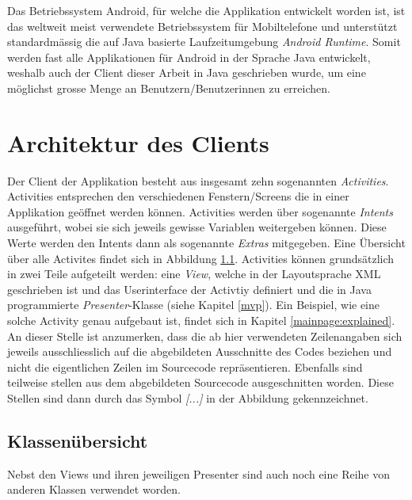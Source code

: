 \documentclass[a4paper,11pt]{report}
\begin{document}
			Das Betriebssystem Android, für welche die Applikation entwickelt worden ist, ist das weltweit meist verwendete Betriebssystem für Mobiltelefone und unterstützt standardmässig die auf Java basierte Laufzeitumgebung \emph{Android Runtime}. Somit werden fast alle Applikationen für Android in der Sprache Java entwickelt, weshalb auch der Client dieser Arbeit in Java geschrieben wurde, um eine möglichst grosse Menge an Benutzern/Benutzerinnen zu erreichen.\cite{android}
			
		\section{Architektur des Clients} %
		Der Client der Applikation besteht aus insgesamt zehn sogenannten \emph{Activities}. Activities entsprechen den verschiedenen Fenstern/Screens die in einer Applikation geöffnet werden können. Activities werden über sogenannte \emph{Intents} ausgeführt, wobei sie sich jeweils gewisse Variablen weitergeben können. Diese Werte werden den Intents dann als sogenannte \emph{Extras} mitgegeben. Eine Übersicht über alle Activites findet sich in Abbildung \ref{}. Activities können grundsätzlich in zwei Teile aufgeteilt werden: eine \emph{View}, welche in der Layoutsprache XML geschrieben ist und das Userinterface der Activtiy definiert und die in Java programmierte \emph{Presenter}-Klasse (siehe Kapitel \ref{mvp}). Ein Beispiel, wie eine solche Activity genau aufgebaut ist, findet sich in Kapitel \ref{mainpage:explained}. An dieser Stelle ist anzumerken, dass die ab hier verwendeten Zeilenangaben sich jeweils ausschliesslich auf die abgebildeten Ausschnitte des Codes beziehen und nicht die eigentlichen Zeilen im Sourcecode repräsentieren. Ebenfalls sind teilweise stellen aus dem abgebildeten Sourcecode ausgeschnitten worden. Diese Stellen sind dann durch das Symbol \emph{[...]} in der Abbildung gekennzeichnet.
				
			\subsection{Klassenübersicht} %
			Nebst den Views und ihren jeweiligen Presenter sind auch noch eine Reihe von anderen Klassen verwendet worden.
\end{document}
